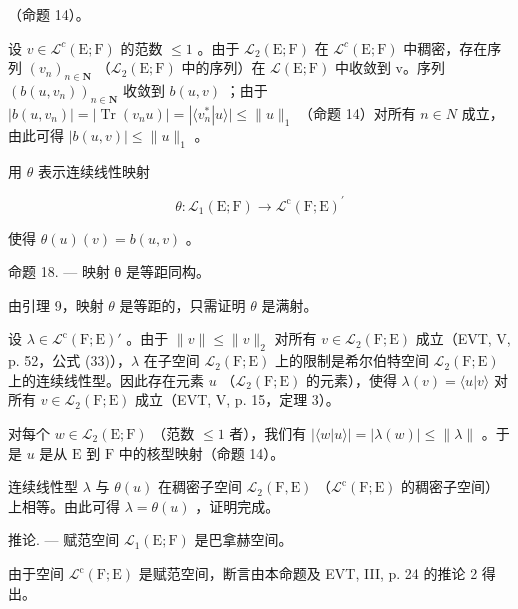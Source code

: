 （命题 14）。

设 \(v \in \mathcal{L}^{c}(\mathrm{E};\mathrm{F})\) 的范数 \(\leqslant 1\) 。由于 \(\mathcal{L}_{2}(\mathrm{E};\mathrm{F})\) 在 \(\mathcal{L}^{c}(\mathrm{E};\mathrm{F})\) 中稠密，存在序列 \((v_{n})_{n\in\mathbf{N}}\) （\(\mathcal{L}_{2}(\mathrm{E};\mathrm{F})\) 中的序列）在 \(\mathcal{L}(\mathrm{E};\mathrm{F})\) 中收敛到 v。序列 \((b(u,v_{n}))_{n\in\mathbf{N}}\) 收敛到 \(b(u,v)\) ；由于 \(|b(u,v_{n})| = |\operatorname{Tr}(v_{n}u)| = |\langle v_{n}^{*}|u\rangle| \leqslant \|u\|_{1}\) （命题 14）对所有 \(n \in N\) 成立，由此可得 \(|b(u,v)| \leqslant \|u\|_{1}\) 。

用 \(\theta\) 表示连续线性映射

\[
\theta \colon \mathcal {L} _ {1} (\mathrm{E}; \mathrm{F}) \to \mathcal {L} ^ {\mathrm{c}} (\mathrm{F}; \mathrm{E}) ^ {\prime}
\]

使得 \(\theta(u)(v) = b(u,v)\) 。

命题 18. --- 映射 θ 是等距同构。

由引理 9，映射 \(\theta\) 是等距的，只需证明 \(\theta\) 是满射。

设 \(\lambda \in \mathcal{L}^{\mathrm{c}}(\mathrm{F};\mathrm{E})'\) 。由于 \(\| v\| \leqslant \| v\|_{2}\) 对所有 \(v\in \mathcal{L}_2(\mathrm{F};\mathrm{E})\) 成立（EVT, V, p. 52，公式 (33)），\(\lambda\) 在子空间 \(\mathcal{L}_2(\mathrm{F};\mathrm{E})\) 上的限制是希尔伯特空间 \(\mathcal{L}_2(\mathrm{F};\mathrm{E})\) 上的连续线性型。因此存在元素 \(u\) （\(\mathcal{L}_2(\mathrm{F};\mathrm{E})\) 的元素），使得 \(\lambda (v) = \langle u|v\rangle\) 对所有 \(v\in \mathcal{L}_2(\mathrm{F};\mathrm{E})\) 成立（EVT, V, p. 15，定理 3）。

对每个 \(w \in \mathcal{L}_2(\mathrm{E};\mathrm{F})\) （范数 \(\leqslant 1\) 者），我们有 \(|\langle w|u\rangle| = |\lambda(w)| \leqslant \| \lambda \|\) 。于是 \(u\) 是从 \(\mathrm{E}\) 到 \(\mathrm{F}\) 中的核型映射（命题 14）。

连续线性型 \(\lambda\) 与 \(\theta(u)\) 在稠密子空间 \(\mathcal{L}_{2}(\mathrm{F},\mathrm{E})\) （\(\mathcal{L}^{\mathrm{c}}(\mathrm{F};\mathrm{E})\) 的稠密子空间）上相等。由此可得 \(\lambda=\theta(u)\) ，证明完成。

推论. --- 赋范空间 \(\mathcal{L}_{1}(\mathrm{E};\mathrm{F})\) 是巴拿赫空间。

由于空间 \(\mathcal{L}^{\mathrm{c}}(\mathrm{F};\mathrm{E})\) 是赋范空间，断言由本命题及 EVT, III, p. 24 的推论 2 得出。

